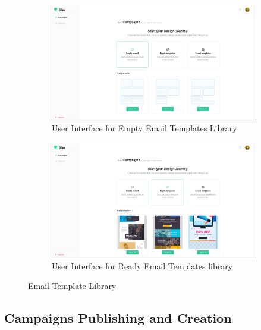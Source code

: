 \begin{figure}[ht]
	\centering
	\begin{subfigure}[b]{0.45\linewidth}
		\includegraphics[width=\linewidth]{Images/Sprint1/screenshots/Screenshot 2024-05-26 214037.png}
		\caption{User Interface for Empty Email Templates Library}
		\label{fig:User Interface for Empty Email Templates Library}
	\end{subfigure}
	\hfill
	\begin{subfigure}[b]{0.45\linewidth}
		\includegraphics[width=\linewidth]{Images/Sprint1/screenshots/Screenshot 2024-05-26 214047.png}
		\caption{User Interface for Ready Email Templates library}
		\label{fig:User Interface for Ready Email Templates library}
	\end{subfigure}
	\caption{Email Template Library}
\end{figure}

\subsection{Campaigns Publishing and Creation}

